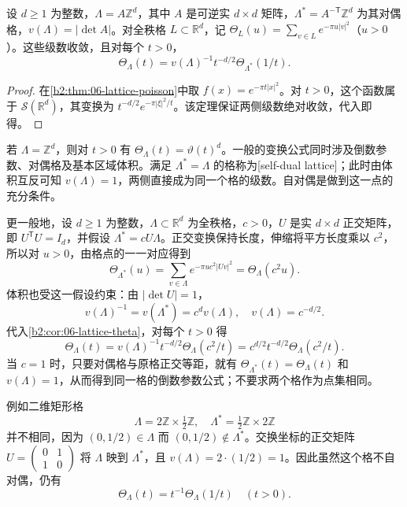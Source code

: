 \begin{corollary}\label{b2:cor:06-lattice-theta}
设 \(d\geq1\) 为整数，\(\Lambda=A\mathbb Z^d\)，其中 \(A\) 是可逆实 \(d\times d\) 矩阵，\(\Lambda^*=A^{-\mathsf T}\mathbb Z^d\) 为其对偶格，\(v(\Lambda)=|\det A|\)。对全秩格 \(L\subset\mathbb R^d\)，记 \(\Theta_L(u)=\sum_{v\in L}e^{-\pi u|v|^2}\)（\(u>0\)）。这些级数收敛，且对每个 \(t>0\)，
\[
 \Theta_\Lambda(t)=v(\Lambda)^{-1}t^{-d/2}\Theta_{\Lambda^*}(1/t).
\]
\end{corollary}
\begin{proof}
在\cref{b2:thm:06-lattice-poisson}中取 \(f(x)=e^{-\pi t|x|^2}\)。对 \(t>0\)，这个函数属于 \(\mathcal S(\mathbb R^d)\)，其变换为 \(t^{-d/2}e^{-\pi|\xi|^2/t}\)。该定理保证两侧级数绝对收敛，代入即得。
\end{proof}

若 \(\Lambda=\mathbb Z^d\)，则对 \(t>0\) 有 \(\Theta_\Lambda(t)=\vartheta(t)^d\)。一般的变换公式同时涉及倒数参数、对偶格及基本区域体积。满足 \(\Lambda^*=\Lambda\) 的格称为[self-dual lattice]；此时由体积互反可知 \(v(\Lambda)=1\)，两侧直接成为同一个格的级数。自对偶是做到这一点的充分条件。

\ProseParagraphBreak

更一般地，设 \(d\geq1\) 为整数，\(\Lambda\subset\mathbb R^d\) 为全秩格，\(c>0\)，\(U\) 是实 \(d\times d\) 正交矩阵，即 \(U^{\mathsf T}U=I_d\)，并假设 \(\Lambda^*=cU\Lambda\)。正交变换保持长度，伸缩将平方长度乘以 \(c^2\)，所以对 \(u>0\)，由格点的一一对应得到
\[
 \Theta_{\Lambda^*}(u)
 =\sum_{v\in\Lambda}e^{-\pi u c^2|Uv|^2}
 =\Theta_\Lambda(c^2u).
\]
体积也受这一假设约束：由 \(|\det U|=1\)，
\[
 v(\Lambda)^{-1}=v(\Lambda^*)=c^dv(\Lambda),
 \quad v(\Lambda)=c^{-d/2}.
\]
代入\cref{b2:cor:06-lattice-theta}，对每个 \(t>0\) 得
\[
 \Theta_\Lambda(t)
 =v(\Lambda)^{-1}t^{-d/2}\Theta_\Lambda(c^2/t)
 =c^{d/2}t^{-d/2}\Theta_\Lambda(c^2/t).
\]
当 \(c=1\) 时，只要对偶格与原格正交等距，就有 \(\Theta_{\Lambda^*}(t)=\Theta_\Lambda(t)\) 和 \(v(\Lambda)=1\)，从而得到同一格的倒数参数公式；不要求两个格作为点集相同。

\ProseParagraphBreak

例如二维矩形格
\[
 \Lambda=2\mathbb Z\times\tfrac12\mathbb Z,
 \quad \Lambda^*=\tfrac12\mathbb Z\times2\mathbb Z
\]
并不相同，因为 \((0,1/2)\in\Lambda\) 而 \((0,1/2)\notin\Lambda^*\)。交换坐标的正交矩阵 \(U=\left(\begin{smallmatrix}0&1\\1&0\end{smallmatrix}\right)\) 将 \(\Lambda\) 映到 \(\Lambda^*\)，且 \(v(\Lambda)=2\cdot(1/2)=1\)。因此虽然这个格不自对偶，仍有
\[
 \Theta_\Lambda(t)=t^{-1}\Theta_\Lambda(1/t)\quad(t>0).
\]

